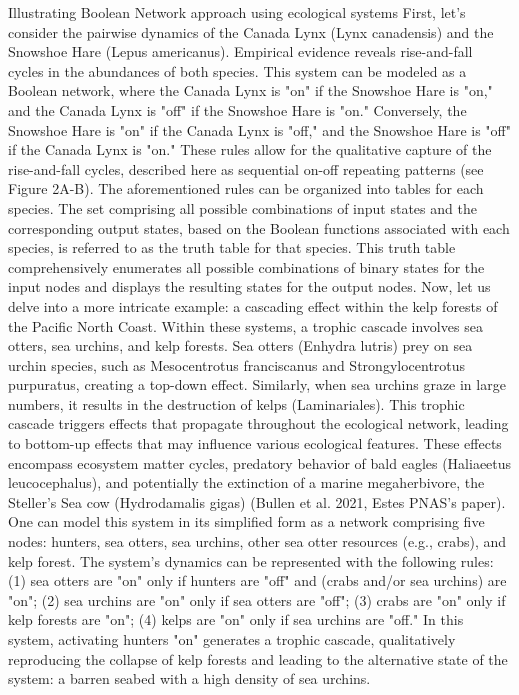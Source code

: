 Illustrating Boolean Network approach using ecological systems 
	First, let's consider the pairwise dynamics of the Canada Lynx (Lynx canadensis) and the Snowshoe Hare (Lepus americanus). Empirical evidence reveals rise-and-fall cycles in the abundances of both species. This system can be modeled as a Boolean network, where the Canada Lynx is "on" if the Snowshoe Hare is "on," and the Canada Lynx is "off" if the Snowshoe Hare is "on." Conversely, the Snowshoe Hare is "on" if the Canada Lynx is "off," and the Snowshoe Hare is "off" if the Canada Lynx is "on." These rules allow for the qualitative capture of the rise-and-fall cycles, described here as sequential on-off repeating patterns (see Figure 2A-B). The aforementioned rules can be organized into tables for each species. The set comprising all possible combinations of input states and the corresponding output states, based on the Boolean functions associated with each species, is referred to as the truth table for that species. This truth table comprehensively enumerates all possible combinations of binary states for the input nodes and displays the resulting states for the output nodes.
	Now, let us delve into a more intricate example: a cascading effect within the kelp forests of the Pacific North Coast. Within these systems, a trophic cascade involves sea otters, sea urchins, and kelp forests. Sea otters (Enhydra lutris) prey on sea urchin species, such as Mesocentrotus franciscanus and Strongylocentrotus purpuratus, creating a top-down effect. Similarly, when sea urchins graze in large numbers, it results in the destruction of kelps (Laminariales). This trophic cascade triggers effects that propagate throughout the ecological network, leading to bottom-up effects that may influence various ecological features. These effects encompass ecosystem matter cycles, predatory behavior of bald eagles (Haliaeetus leucocephalus), and potentially the extinction of a marine megaherbivore, the Steller’s Sea cow (Hydrodamalis gigas) (Bullen et al. 2021, Estes PNAS’s paper). 
	One can model this system in its simplified form as a network comprising five nodes: hunters, sea otters, sea urchins, other sea otter resources (e.g., crabs), and kelp forest. The system’s dynamics can be represented with the following rules: (1) sea otters are "on" only if hunters are "off" and (crabs and/or sea urchins) are "on"; (2) sea urchins are "on" only if sea otters are "off"; (3) crabs are "on" only if kelp forests are "on"; (4) kelps are "on" only if sea urchins are "off." In this system, activating hunters "on" generates a trophic cascade, qualitatively reproducing the collapse of kelp forests and leading to the alternative state of the system: a barren seabed with a high density of sea urchins. 

